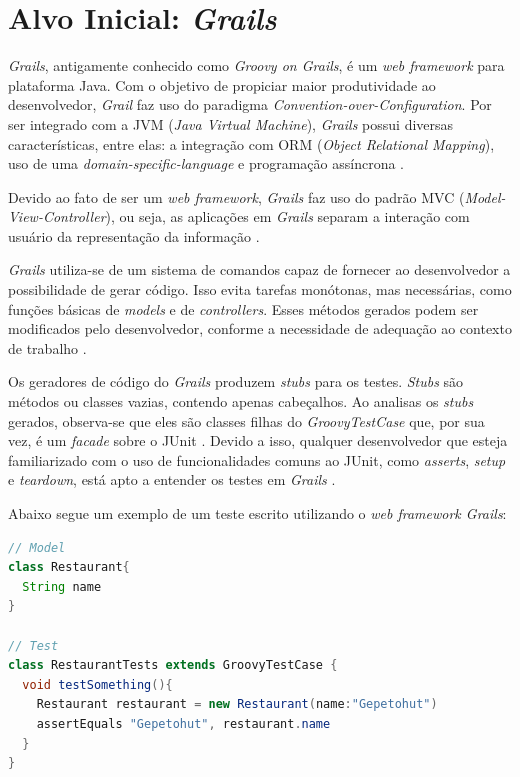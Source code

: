 \section{Alvo Inicial: \textit{Grails}} 
\textit{Grails}, antigamente conhecido como \textit{Groovy on Grails}, é um \textit{web framework} para plataforma Java. Com o objetivo de propiciar maior produtividade ao desenvolvedor, \textit{Grail} faz uso do paradigma \textit{Convention-over-Configuration}.  Por ser integrado com a JVM (\textit{Java Virtual Machine}), \textit{Grails} possui diversas características, entre elas: a integração com ORM (\textit{Object Relational Mapping}), uso de uma \textit{domain-specific-language} e programação assíncrona \cite{grails2015}.
\par
\indent Devido ao fato de ser um \textit{web framework}, \textit{Grails} faz uso do padrão MVC (\textit{Model-View-Controller}), ou seja, as aplicações em \textit{Grails} separam a interação com usuário da representação da informação \cite{grails2015}.
\par
\indent \textit{Grails} utiliza-se de um sistema de comandos capaz de fornecer ao desenvolvedor a possibilidade de gerar código. Isso evita tarefas monótonas, mas necessárias, como funções básicas de \textit{models} e de \textit{controllers}. Esses métodos gerados podem ser modificados pelo desenvolvedor, conforme a necessidade de adequação ao contexto de trabalho  \cite{grails2015}.
\par
\indent Os geradores de código do \textit{Grails} produzem  \textit{stubs} para os testes. \textit{Stubs} são métodos ou classes vazias, contendo apenas cabeçalhos. Ao analisas os \textit{stubs} gerados, observa-se que eles são classes filhas do \textit{GroovyTestCase} que, por sua vez, é um \textit{facade} sobre o JUnit \cite{broughton2010}. Devido a isso, qualquer desenvolvedor que esteja familiarizado com o uso de funcionalidades comuns ao JUnit, como \textit{asserts}, \textit{setup} e \textit{teardown}, está apto a entender os testes em \textit{Grails} \cite{broughton2010}.
\par
\indent Abaixo segue um exemplo de um teste escrito utilizando o \textit{web framework Grails}:

\begin{lstlisting}[language=java, label=exTesteGrails, caption={Exemplo de Teste em \textit{Grails}}]
// Model
class Restaurant{
  String name
}

// Test
class RestaurantTests extends GroovyTestCase {
  void testSomething(){
    Restaurant restaurant = new Restaurant(name:"Gepetohut")
    assertEquals "Gepetohut", restaurant.name
  }
}
\end{lstlisting}

